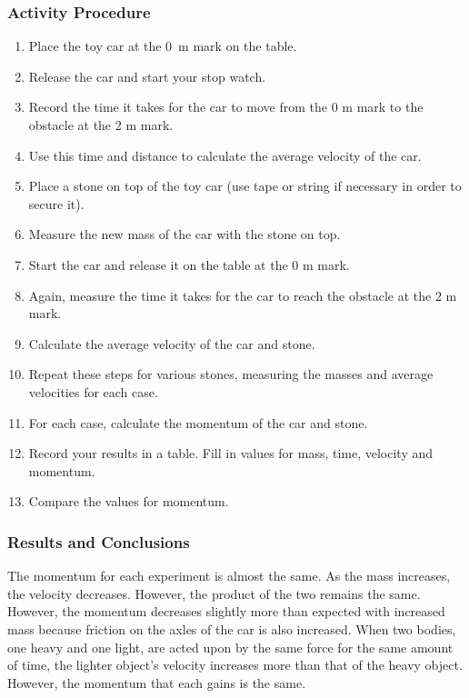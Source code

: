 \subsubsection*{Activity Procedure}
\begin{enumerate}
\item{Place the toy car at the 0~m mark on the table.}
\item{Release the car and start your stop watch.}
\item{Record the time it takes for the car to move from the 0 m mark to the obstacle at the 2 m mark.}
\item{Use this time and distance to calculate the average velocity of the car.}
\item{Place a stone on top of the toy car (use tape or string if necessary in order to secure it).}
\item{Measure the new mass of the car with the stone on top.}
\item{Start the car and release it on the table at the 0 m mark.}
\item{Again, measure the time it takes for the car to reach the obstacle at the 2 m mark.}
\item{Calculate the average velocity of the car and stone.}
\item{Repeat these steps for various stones, measuring the masses and average velocities for each case.}
\item{For each case, calculate the momentum of the car and stone.}
\item{Record your results in a table.  Fill in values for mass, time, velocity and momentum.}
\item{Compare the values for momentum.}
\end{enumerate}

\subsubsection*{Results and Conclusions}
The momentum for each experiment is almost the same.  As the mass increases, the velocity decreases.  However, the product of the two remains the same.  However, the momentum decreases slightly more than expected with increased mass because friction on the axles of the car is also increased.
When two bodies, one heavy and one light, are acted upon by the same force for the same amount of time, the lighter object's velocity increases more than that of the heavy object.  However, the momentum that each gains is the same.

